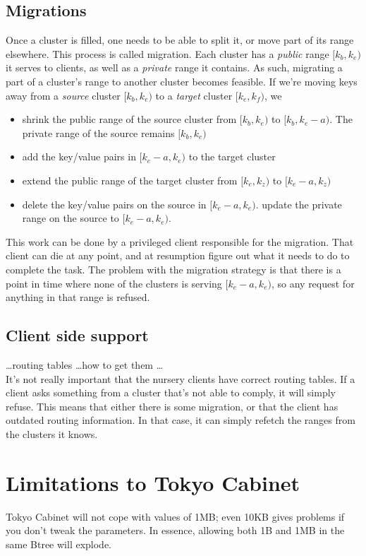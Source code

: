 \subsection{Migrations}
Once a cluster is filled, one needs to be able to split it, or move part of its range elsewhere. This process is called migration.
Each cluster has a \emph{public} range $[k_b,k_e)$ it serves to clients, as well as a \emph{private} range it contains. 
As such, migrating a part of a cluster's range to another cluster becomes feasible. 
If we're moving keys away from a \emph{source} cluster $[k_b,k_e)$ 
to a \emph{target} cluster $[k_e,k_f)$, we
\begin{itemize}
\item{} shrink the public range of the source cluster from 
$[k_b,k_e)$ to $[k_b, k_e - a)$. 
The private range of the source remains $[k_b,k_e)$
\item{} add the key/value pairs in $[k_e - a,k_e)$ to the target cluster
\item{} extend the public range of the target cluster from
$[k_e,k_z)$ to $[k_e - a, k_z)$
\item{} delete the key/value pairs on the source in $[k_e -a,k_e)$.
        update the private range on the source to $[k_e - a, k_e)$.
\end{itemize}
This work can be done by a privileged client responsible for the migration. 
That client can die at any point, and at resumption figure out what it needs to do to complete the task. 
The problem with the migration strategy is that there is a point in time where none of the clusters is serving $[k_e -a, k_e)$, so any request for anything in that range is refused.
\subsection{Client side support}
\ldots routing tables \ldots how to get them \ldots \\
It's not really important that the nursery clients have correct routing tables. 
If a client asks something from a cluster that's not able to comply, it will simply refuse. This means that either there is some migration, or that the client has outdated routing information. In that case, it can simply refetch the ranges from the clusters it knows.

\section{Limitations to Tokyo Cabinet}
Tokyo Cabinet will not cope with values of 1MB; 
even 10KB gives problems if you don't tweak the parameters. 
In essence, allowing both 1B and 1MB in the same Btree will explode.
